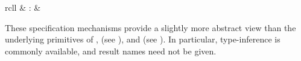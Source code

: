 \begin{isabellebody}
\begin{isamarkuptext}
\begin{matharray}{rcll}
    \hypertarget{command.print-abbrevs}{\hyperlink{command.print-abbrevs}{\mbox{}}} & : &  \\
  \end{matharray}

  These specification mechanisms provide a slightly more abstract view
  than the underlying primitives of \hyperlink{command.consts}{\mbox{}}, \hyperlink{command.defs}{\mbox{}} (see ), and \hyperlink{command.axioms}{\mbox{}} (see
  ).  In particular, type-inference is commonly
  available, and result names need not be given.


\end{isamarkuptext}
\end{isabellebody}
